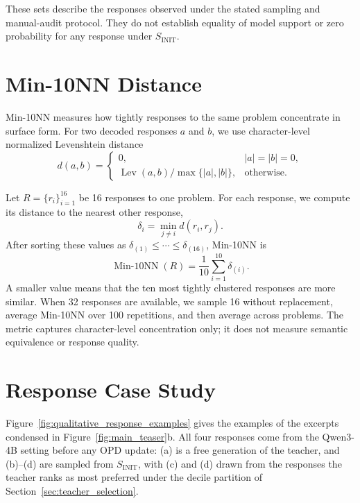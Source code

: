 

These sets describe the responses observed under the stated sampling and
manual-audit protocol. They do not establish equality of model support or
zero probability for any response under $S_{\mathrm{INIT}}$.

\FloatBarrier

\section{Min-10NN Distance}
\label{app:response_geometry}

Min-10NN measures how tightly responses to the same problem concentrate in
surface form. For two decoded responses $a$ and $b$, we use character-level
normalized Levenshtein distance
\begin{equation}
    d(a,b)=
    \begin{cases}
        0, & |a|=|b|=0,\\
        \operatorname{Lev}(a,b)/\max\{|a|,|b|\}, & \text{otherwise}.
    \end{cases}
\end{equation}

Let $R=\{r_i\}_{i=1}^{16}$ be 16 responses to one problem. For each response,
we compute its distance to the nearest other response,
\begin{equation}
    \delta_i=\min_{j\ne i}d(r_i,r_j).
\end{equation}
After sorting these values as
$\delta_{(1)}\leq\cdots\leq\delta_{(16)}$, Min-10NN is
\begin{equation}
    \operatorname{Min\text{-}10NN}(R)
    =\frac{1}{10}\sum_{i=1}^{10}\delta_{(i)}.
\end{equation}
A smaller value means that the ten most tightly clustered responses are more
similar. When 32 responses are available, we sample 16 without replacement,
average Min-10NN over 100 repetitions, and then average across problems. The
metric captures character-level concentration only; it does not measure
semantic equivalence or response quality.

\FloatBarrier

\section{Response Case Study}
\label{app:response_excerpts}

Figure~\ref{fig:qualitative_response_examples} gives the examples of the
excerpts condensed in Figure~\ref{fig:main_teaser}b. All four responses come
from the Qwen3-4B setting before any OPD update: (a) is a free generation of
the teacher, and (b)--(d) are sampled from $S_{\mathrm{INIT}}$, with (c) and
(d) drawn from the responses the teacher ranks as most preferred under the
decile partition of Section~\ref{sec:teacher_selection}.

